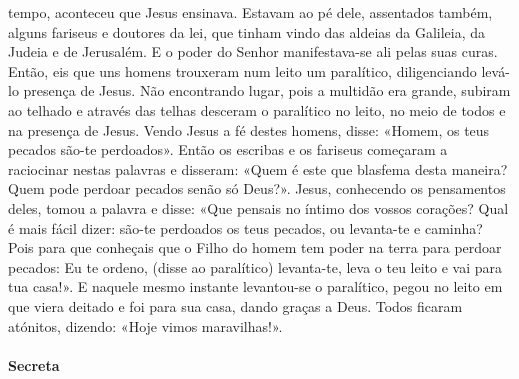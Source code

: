 \begin{paracol}{2}
{ tempo, aconteceu que Jesus ensinava. Estavam ao pé dele, assentados também, alguns fariseus e doutores da lei, que tinham vindo das aldeias da Galileia, da Judeia e de Jerusalém. E o poder do Senhor manifestava-se ali pelas suas curas. Então, eis que uns homens trouxeram num leito um paralítico, diligenciando levá-lo presença de Jesus. Não encontrando lugar, pois a multidão era grande, subiram ao telhado e através das telhas desceram o paralítico no leito, no meio de todos e na presença de Jesus. Vendo Jesus a fé destes homens, disse: «Homem, os teus pecados são-te perdoados». Então os escribas e os fariseus começaram a raciocinar nestas palavras e disseram: «Quem é este que blasfema desta maneira? Quem pode perdoar pecados senão só Deus?». Jesus, conhecendo os pensamentos deles, tomou a palavra e disse: «Que pensais no íntimo dos vossos corações? Qual é mais fácil dizer: são-te perdoados os teus pecados, ou levanta-te e caminha? Pois para que conheçais que o Filho do homem tem poder na terra para perdoar pecados: Eu te ordeno, (disse ao paralítico) levanta-te, leva o teu leito e vai para tua casa!». E naquele mesmo instante levantou-se o paralítico, pegou no leito em que viera deitado e foi para sua casa, dando graças a Deus. Todos ficaram atónitos, dizendo: «Hoje vimos maravilhas!».
}\end{paracol}

\begin{paracol}{2}\switchcolumn{}\end{paracol}

\paragraph{Secreta}
\begin{paracol}{2}\switchcolumn{}\end{paracol}

